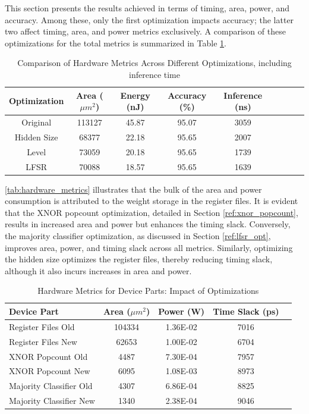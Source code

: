 \documentclass[conference]{IEEEtran}
\begin{document}
This section presents the results achieved in terms of timing, area, power, and accuracy. Among these, only the first optimization impacts accuracy; the latter two affect timing, area, and power metrics exclusively. A comparison of these optimizations for the total metrics is summarized in Table \ref{tab:optimization_metrics}. 


\begin{table}[h]
    \centering
    \caption{Comparison of Hardware Metrics Across Different Optimizations, including inference time}
    \label{tab:optimization_metrics}
    \begin{tabular}{@{}ccccccccc@{}}
        \toprule
        \textbf{Optimization} & \textbf{Area ($\mu m^2$)} & \textbf{Energy (nJ)} & \textbf{Accuracy (\%)} & \textbf{Inference (ns)}  \\
        \midrule
        Original & 113127 & 45.87 & 95.07 & 3059 \\
        Hidden Size & 68377 & 22.18 & 95.65 & 2007 \\
        Level & 73059 & 20.18 & 95.65 & 1739 \\
        LFSR & 70088 & 18.57 & 95.65 & 1639 \\
        \bottomrule
    \end{tabular}
\end{table}

\autoref{tab:hardware_metrics} illustrates that the bulk of the area and power consumption is attributed to the weight storage in the register files. It is evident that the XNOR popcount optimization, detailed in Section \ref{ref:xnor_popcount}, results in increased area and power but enhances the timing slack. Conversely, the majority classifier optimization, as discussed in Section \ref{ref:lfsr_opt}, improves area, power, and timing slack across all metrics. Similarly, optimizing the hidden size optimizes the register files, thereby reducing timing slack, although it also incurs increases in area and power.

\begin{table}[h]
    \centering
    \caption{Hardware Metrics for Device Parts: Impact of Optimizations}
    \label{tab:hardware_metrics}
    \begin{tabular}{@{}lcccc@{}}
        \toprule
        \textbf{Device Part} & \textbf{Area (\(\mu m^2\))} & \textbf{Power (W)} & \textbf{Time Slack (ps)} \\
        \midrule
        Register Files Old & 104334 & 1.36E-02 & 7016 \\
        Register Files New & 62653 & 1.00E-02 & 6704 \\
        XNOR Popcount Old & 4487 & 7.30E-04 & 7957 \\
        XNOR Popcount New & 6095 & 1.08E-03 & 8973 \\
        Majority Classifier Old & 4307 & 6.86E-04 & 8825 \\
        Majority Classifier New & 1340 & 2.38E-04 & 9046 \\
        \bottomrule
    \end{tabular}
\end{table}
\end{document}
